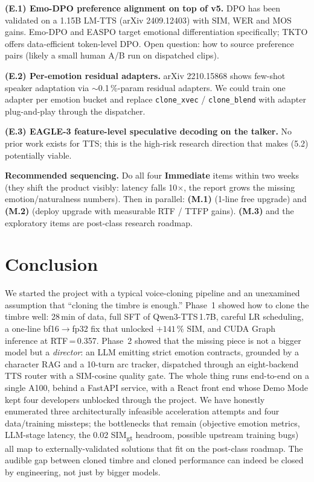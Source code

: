 \documentclass[10pt,a4paper]{article}
\begin{document}
\noindent\textbf{(E.1) Emo-DPO preference alignment on top of v5.}
DPO has been validated on a 1.15B LM-TTS (arXiv 2409.12403) with SIM, WER
and MOS gains. Emo-DPO and EASPO target emotional differentiation
specifically; TKTO offers data-efficient token-level DPO. Open question:
how to source preference pairs (likely a small human A/B run on dispatched
clips).

\noindent\textbf{(E.2) Per-emotion residual adapters.}
arXiv 2210.15868 shows few-shot speaker adaptation via $\sim$0.1\,\%-param
residual adapters. We could train one adapter per emotion bucket and
replace \texttt{clone\_xvec} / \texttt{clone\_blend} with adapter
plug-and-play through the dispatcher.

\noindent\textbf{(E.3) EAGLE-3 feature-level speculative decoding on
the talker.} No prior work exists for TTS; this is the high-risk research
direction that makes (5.2) potentially viable.

\begin{insightbox}\small
\textbf{Recommended sequencing.} Do all four \textbf{Immediate} items
within two weeks (they shift the product visibly: latency falls 10$\times$,
the report grows the missing emotion/naturalness numbers). Then in
parallel: \textbf{(M.1)} (1-line free upgrade) and \textbf{(M.2)} (deploy
upgrade with measurable RTF / TTFP gains). \textbf{(M.3)} and the
exploratory items are post-class research roadmap.
\end{insightbox}

\section{Conclusion}

We started the project with a typical voice-cloning pipeline and an
unexamined assumption that ``cloning the timbre is enough.'' Phase~1
showed how to clone the timbre well: 28\,min of data, full SFT of
Qwen3-TTS\,1.7B, careful LR scheduling, a one-line bf16$\to$fp32 fix that
unlocked $+141\,\%$ SIM, and CUDA Graph inference at RTF\,=\,0.357.
Phase~2 showed that the missing piece is not a bigger model but a
\emph{director}: an LLM emitting strict emotion contracts, grounded by a
character RAG and a 10-turn arc tracker, dispatched through an
eight-backend TTS router with a SIM-cosine quality gate. The whole thing
runs end-to-end on a single A100, behind a FastAPI service, with a React
front end whose Demo Mode kept four developers unblocked through the
project. We have honestly enumerated three architecturally infeasible
acceleration attempts and four data/training missteps; the bottlenecks
that remain (objective emotion metrics, LLM-stage latency, the 0.02
SIM\textsubscript{gt} headroom, possible upstream training bugs) all map to
externally-validated solutions that fit on the post-class roadmap.
The audible gap between cloned timbre and cloned performance can indeed
be closed by engineering, not just by bigger models.
\end{document}
